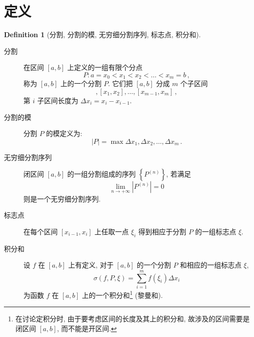 \documentclass{book}
\newcommand{\set}[1]{\left\{#1\right\}}
\newcommand{\abs}[1]{\left\lvert #1 \right\rvert}
\numberwithin{equation}{section}
\numberwithin{figure}{section}
\theoremstyle{definition}
\newtheorem{definition}{Definition}
\begin{document}
\section{定义}
\begin{definition}[分割, 分割的模, 无穷细分割序列, 标志点, 积分和]
  \leavevmode

  \begin{description}
    \item[分割] 在区间 $[a,b]$ 上定义的一组有限个分点
      \begin{equation*}
	P:a=x_0<x_1<x_2<\ldots<x_m=b\,,
      \end{equation*}
      称为 $[a,b]$ 上的一个分割 $P$.
      它们把 $[a,b]$ 分成 $m$ 个子区间
      \begin{equation*}
	[x_0,x_1],[x_1,x_2],\ldots,[x_{m-1},x_m]\,,
      \end{equation*}
      第 $i$ 子区间长度为 $\Delta x_i=x_i-x_{i-1}$.
    \item[分割的模] 分割 $P$ 的模定义为:
      \begin{equation*}
	\abs{P}=\max{\Delta x_1,\Delta x_2,\ldots,\Delta x_m}\,.
      \end{equation*}
    \item[无穷细分割序列] 闭区间 $[a,b]$ 的一组分割组成的序列 $\set{P^{(n)}}$, 若满足
      \begin{equation*}
	\lim_{n\to+\infty}\abs{P^{(n)}}=0
      \end{equation*}
      则是一个无穷细分割序列.
    \item[标志点] 在每个区间 $[x_{i-1},x_{i}]$ 上任取一点 $\xi_i$ 得到相应于分割 $P$ 的一组标志点 $\xi$.
    \item[积分和] 设 $f$ 在 $[a,b]$ 上有定义, 对于 $[a,b]$ 的一个分割 $P$ 和相应的一组标志点 $\xi$, 
      \begin{equation*}
	\sigma(f,P,\xi)=\sum_{i=1}^{m}f(\xi_i)\Delta x_i
      \end{equation*}
      为函数 $f$ 在 $[a,b]$ 上的一个积分和\footnote{在讨论定积分时, 由于要考虑区间的长度及其上的积分和, 故涉及的区间需要是闭区间 $[a,b]$, 而不能是开区间.} (黎曼和).
  \end{description}
\end{definition}
\end{document}

